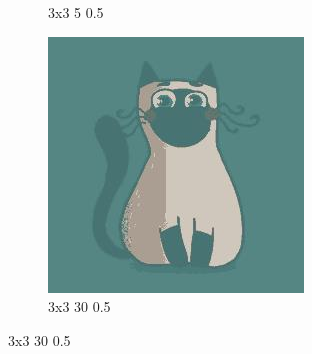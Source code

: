 \documentclass[12pt,a4paper]{article}
\begin{document}
\begin{figure}[H]
\begin{subfigure}{0.25\textwidth}
  \caption{3x3 5 0.5}
  \label{fig:2}
\end{subfigure}\hfil %
\begin{subfigure}{0.25\textwidth}
  \includegraphics[width=\linewidth]{images/cartoon/3-3-30-05}
  \caption{3x3 30 0.5}
  \label{fig:3}
\end{subfigure}


\end{figure}
\end{document}
